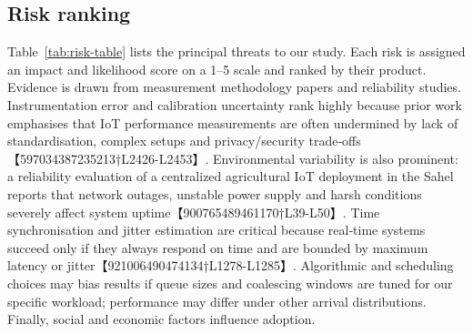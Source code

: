 \documentclass[12pt,onecolumn]{IEEEtran} %
\begin{document}
\subsection{Risk ranking}
Table~\ref{tab:risk-table} lists the principal threats to our study.  Each risk is assigned an impact and likelihood score on a 1--5 scale and ranked by their product.  Evidence is drawn from measurement methodology papers and reliability studies.  Instrumentation error and calibration uncertainty rank highly because prior work emphasises that IoT performance measurements are often undermined by lack of standardisation, complex setups and privacy/security trade‑offs【597034387235213†L2426-L2453】.  Environmental variability is also prominent: a reliability evaluation of a centralized agricultural IoT deployment in the Sahel reports that network outages, unstable power supply and harsh conditions severely affect system uptime【900765489461170†L39-L50】.  Time synchronisation and jitter estimation are critical because real‑time systems succeed only if they always respond on time and are bounded by maximum latency or jitter【921006490474134†L1278-L1285】.  Algorithmic and scheduling choices may bias results if queue sizes and coalescing windows are tuned for our specific workload; performance may differ under other arrival distributions.  Finally, social and economic factors influence adoption.
\end{document}
